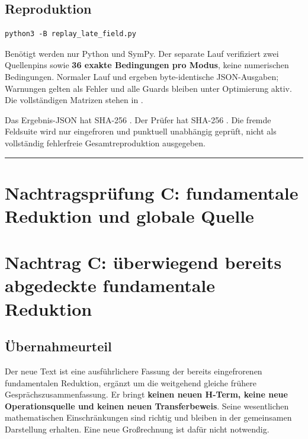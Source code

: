 \subsection{Reproduktion}\label{reproduktion}

\begin{verbatim}
python3 -B replay_late_field.py
\end{verbatim}

Benötigt werden nur Python und SymPy. Der separate Lauf verifiziert zwei
Quellenpins sowie \textbf{36 exakte Bedingungen pro Modus}, keine
numerischen Bedingungen. Normaler Lauf und  ergeben
byte-identische JSON-Ausgaben; Warnungen gelten als Fehler und alle
Guards bleiben unter Optimierung aktiv. Die vollständigen Matrizen
stehen in .

Das Ergebnis-JSON hat SHA-256
.
Der Prüfer hat SHA-256
.
Die fremde Feldsuite wird nur eingefroren und punktuell unabhängig
geprüft, nicht als vollständig fehlerfreie Gesamtreproduktion
ausgegeben.

\begin{center}\rule{0.5\linewidth}{0.5pt}\end{center}

\section{Nachtragsprüfung C: fundamentale Reduktion und globale
Quelle}\label{nachtragspruxfcfung-c-fundamentale-reduktion-und-globale-quelle}

\section{Nachtrag C: überwiegend bereits abgedeckte fundamentale
Reduktion}\label{nachtrag-c-uxfcberwiegend-bereits-abgedeckte-fundamentale-reduktion}

\subsection{Übernahmeurteil}\label{uxfcbernahmeurteil}

Der neue Text ist eine ausführlichere Fassung der bereits eingefrorenen
fundamentalen Reduktion, ergänzt um die weitgehend gleiche frühere
Gesprächszusammenfassung. Er bringt \textbf{keinen neuen H-Term, keine
neue Operationsquelle und keinen neuen Transferbeweis}. Seine
wesentlichen mathematischen Einschränkungen sind richtig und bleiben in
der gemeinsamen Darstellung erhalten. Eine neue Großrechnung ist dafür
nicht notwendig.

